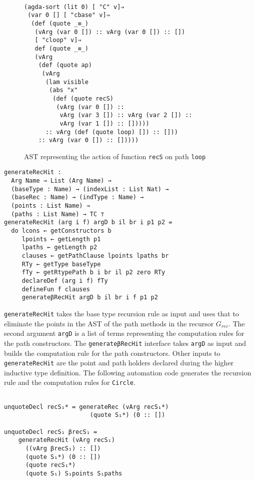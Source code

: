 \documentclass[sigplan,10pt]{acmart}
\begin{document}
\begin{figure}
\begin{center}
\begingroup
\fontsize{7pt}{9pt}\selectfont
\begin{Verbatim}

(agda-sort (lit 0) [ "C" v]⇒
 (var 0 [] [ "cbase" v]⇒
  (def (quote _≡_)
   (vArg (var 0 []) :: vArg (var 0 []) :: [])
   [ "cloop" v]⇒
   def (quote _≡_)
   (vArg
    (def (quote ap)
     (vArg
      (lam visible
       (abs "x"
        (def (quote recS)
         (vArg (var 0 []) ::
          vArg (var 3 []) :: vArg (var 2 []) :: 
          vArg (var 1 []) :: []))))
      :: vArg (def (quote loop) []) :: []))
    :: vArg (var 0 []) :: []))))

\end{Verbatim}
\endgroup
\end{center}
\caption{AST representing the action of function {\tt recS} on path {\tt loop}}
\label{fig:ast-beta-f}
\end{figure}

\begin{center}
\begingroup
\begin{BVerbatim}
generateRecHit : 
  Arg Name → List (Arg Name) →
  (baseType : Name) → (indexList : List Nat) →
  (baseRec : Name) → (indType : Name) →
  (points : List Name) → 
  (paths : List Name) → TC ⊤
generateRecHit (arg i f) argD b il br i p1 p2 =
  do lcons ← getConstructors b
     lpoints ← getLength p1
     lpaths ← getLength p2
     clauses ← getPathClause lpoints lpaths br
     RTy ← getType baseType
     fTy ← getRtypePath b i br il p2 zero RTy
     declareDef (arg i f) fTy
     defineFun f clauses
     generateβRecHit argD b il br i f p1 p2
\end{BVerbatim}
\endgroup
\end{center}

{\tt generateRecHit} takes the base type recursion rule as input and uses that to eliminate the points in the AST of the path methods in the recursor $G_{rec}$. The second argument {\tt argD} is a list of terms representing the computation rules for the path constructors. The {\tt generateβRecHit} interface takes {\tt argD} as input and builds the computation rule for the path constructors. Other inputs to {\tt generateRecHit} are the point and path holders declared during the higher inductive type definition. The following automation code generates the recursion rule and the computation rules for {\tt Circle}.

\begin{center}
\begingroup
\begin{BVerbatim}

unquoteDecl recS₁* = generateRec (vArg recS₁*)
                        (quote S₁*) (0 :: [])

unquoteDecl recS₁ βrecS₁ = 
    generateRecHit (vArg recS₁)
      ((vArg βrecS₁) :: [])
      (quote S₁*) (0 :: [])
      (quote recS₁*)
      (quote S₁) S₁points S₁paths
\end{BVerbatim}
\endgroup
\end{center}
\end{document}

